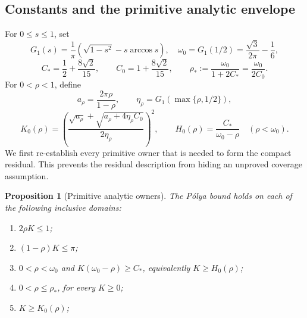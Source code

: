 \documentclass[11pt]{article}
\numberwithin{equation}{section}
\newtheorem{proposition}[theorem]{Proposition}
\theoremstyle{definition}
\theoremstyle{remark}
\begin{document}
\subsection{Constants and the primitive analytic envelope}

For \(0\leq s\leq1\), set
\[
 G_1(s)=\frac1\pi\left(\sqrt{1-s^2}-s\arccos s\right),
 \quad
 \omega_0=G_1(1/2)=\frac{\sqrt3}{2\pi}-\frac16,
\]
\[
 C_*=\frac12+\frac{8\sqrt2}{15},\qquad
 C_0=1+\frac{8\sqrt2}{15},\qquad
 \rho_*:=\frac{\omega_0}{1+2C_*}=\frac{\omega_0}{2C_0}.
\]
For \(0<\rho<1\), define
\[
 a_\rho=\frac{2\pi\rho}{1-\rho},\qquad
 \eta_\rho=G_1\!\left(\max\{\rho,1/2\}\right),
\]
\begin{equation}
 K_0(\rho)=
 \left(
 \frac{\sqrt{a_\rho}+\sqrt{a_\rho+4\eta_\rho C_0}}
 {2\eta_\rho}
 \right)^2,
 \qquad
 H_0(\rho)=\frac{C_*}{\omega_0-\rho}\quad(\rho<\omega_0).
 \label{cm:eq-upper-functions}
\end{equation}
We first re-establish every primitive owner that is needed to form the
compact residual.  This prevents the residual description from hiding an
unproved coverage assumption.

\begin{proposition}[Primitive analytic owners]
\label{cm:prop-primitive-owners}
The P\'olya bound holds on each of the following inclusive domains:
\begin{enumerate}
\item \(2\rho K\leq1\);
\item \((1-\rho)K\leq\pi\);
\item \(0<\rho<\omega_0\) and
      \(K(\omega_0-\rho)\geq C_*\), equivalently \(K\geq H_0(\rho)\);
\item \(0<\rho\leq\rho_*\), for every \(K\geq0\);
\item \(K\geq K_0(\rho)\);
\end{enumerate}
\end{proposition}
\end{document}
